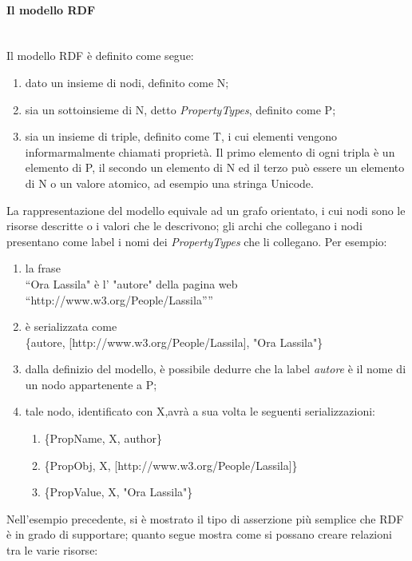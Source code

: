 \documentclass[12pt,a4paper,twoside]{book}
\begin{document}
\paragraph{Il modello RDF}\mbox{}\\
Il modello RDF è definito come segue\cite{RDF}:
\begin{enumerate}
\item dato un insieme di nodi, definito come N;
\item sia un sottoinsieme di N, detto \textit{PropertyTypes}, definito come P;
\item sia un insieme di triple, definito come T, i cui elementi vengono informarmalmente chiamati proprietà. Il primo elemento di ogni tripla è un elemento di P, il secondo un elemento di N ed il terzo può essere un elemento di N o un valore atomico, ad esempio una stringa Unicode.
\end{enumerate}
La rappresentazione del modello equivale ad un grafo orientato, i cui nodi sono le risorse descritte o i valori che le descrivono; gli archi che collegano i nodi presentano come label i nomi dei \textit{PropertyTypes} che li collegano. Per esempio:
\begin{enumerate}
\item la frase \\``Ora Lassila" è l' "autore" della pagina web ``http://www.w3.org/People/Lassila''''
\item è serializzata come \\ \{autore, [http://www.w3.org/People/Lassila], "Ora Lassila"\}
\item dalla definizio del modello, è possibile dedurre che la label \textit{autore} è il nome di un nodo appartenente a P;
\item tale nodo, identificato con X,avrà a sua volta le seguenti serializzazioni:
\begin{enumerate}
\item \{PropName,  X, author\}
\item \{PropObj,   X, [http://www.w3.org/People/Lassila]\}
\item \{PropValue, X, "Ora Lassila"\}
\end{enumerate}

\end{enumerate}
Nell'esempio precedente, si è mostrato il tipo di asserzione più semplice che RDF è in grado di supportare; quanto segue mostra come si possano creare relazioni tra le varie risorse:
\end{document}
